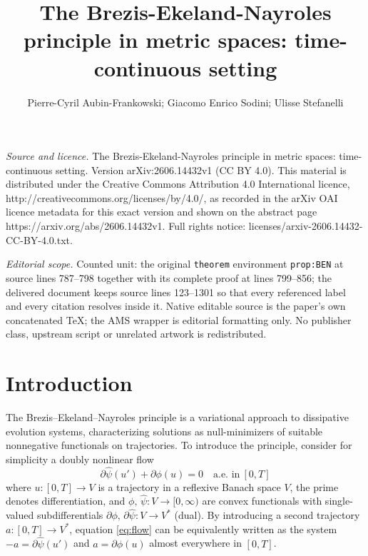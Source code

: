 \documentclass[10pt,a4paper]{amsart}
\begin{document}
\title[The Brezis-Ekeland-Nayroles principle in metric spaces: time]{The Brezis-Ekeland-Nayroles principle in metric spaces: time-continuous setting}
\author{Pierre-Cyril Aubin-Frankowski; Giacomo Enrico Sodini; Ulisse Stefanelli}
\date{}
\maketitle
\noindent\emph{Source and licence.} The Brezis-Ekeland-Nayroles principle in metric spaces: time-continuous setting. Version arXiv:2606.14432v1 (CC BY 4.0). This material is distributed under the Creative Commons Attribution 4.0 International licence, http://creativecommons.org/licenses/by/4.0/, as recorded in the arXiv OAI licence metadata for this exact version and shown on the abstract page https://arxiv.org/abs/2606.14432v1. Full rights notice: licenses/arxiv-2606.14432-CC-BY-4.0.txt.\par\smallskip
\noindent\textit{Editorial scope.} Counted unit: the original \texttt{theorem} environment \texttt{prop:BEN} at source lines 787--798 together with its complete proof at lines 799--856; the delivered document keeps source lines 123--1301 so that every referenced label and every citation resolves inside it. Native editable source is the paper's own concatenated TeX; the AMS wrapper is editorial formatting only. No publisher class, upstream script or unrelated artwork is redistributed.
 \section{Introduction}

 \setcounter{equation}{0}





The Brezis--Ekeland--Nayroles principle \cite{Brezis-Ekeland76b,Brezis-Ekeland76, Nayroles76, Nayroles76b}  is a variational
approach to dissipative evolution systems, characterizing solutions as null-minimizers of suitable
nonnegative functionals on trajectories. To introduce the principle, consider for simplicity a doubly nonlinear flow
\begin{equation} \partial \hat \psi( u' ) + \partial \phi(u) = 0 \quad \text{a.e. in} \
[0,T]\label{eq:flow}
\end{equation}
where $u:[0,T]\to V$ is a trajectory in a reflexive Banach space $V$,
the prime denotes  differentiation,  and $\phi, \,\hat \psi: V \to
[0,\infty)$ are convex functionals with single-valued subdifferentials
$\partial \phi, \, \partial \hat \psi:V \to V^*$ (dual).   By introducing a second
trajectory $a:[0,T] \to V^*$, equation
\eqref{eq:flow} can be equivalently written as the system  $-a =
\partial \hat\psi(u')$ and $a =\partial
\phi(u) $ almost everywhere in $[0,T]$.
\end{document}
